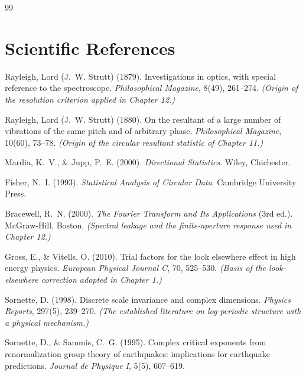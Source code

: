 \documentclass[11pt, letterpaper, openany]{book}
\begin{document}
\begin{thebibliography}{99}
\section*{Scientific References}


Rayleigh, Lord (J.~W. Strutt) (1879).
Investigations in optics, with special reference to the spectroscope.
\textit{Philosophical Magazine}, 8(49), 261--274.
\textit{(Origin of the resolution criterion applied in Chapter 12.)}

Rayleigh, Lord (J.~W. Strutt) (1880).
On the resultant of a large number of vibrations of the same pitch and of arbitrary phase.
\textit{Philosophical Magazine}, 10(60), 73--78.
\textit{(Origin of the circular resultant statistic of Chapter 11.)}

Mardia, K.~V., \& Jupp, P.~E. (2000).
\textit{Directional Statistics}. Wiley, Chichester.

Fisher, N.~I. (1993).
\textit{Statistical Analysis of Circular Data}. Cambridge University Press.

Bracewell, R.~N. (2000).
\textit{The Fourier Transform and Its Applications} (3rd ed.). McGraw-Hill, Boston.
\textit{(Spectral leakage and the finite-aperture response used in Chapter 12.)}

Gross, E., \& Vitells, O. (2010).
Trial factors for the look elsewhere effect in high energy physics.
\textit{European Physical Journal C}, 70, 525--530.
\textit{(Basis of the look-elsewhere correction adopted in Chapter 1.)}


Sornette, D. (1998).
Discrete scale invariance and complex dimensions.
\textit{Physics Reports}, 297(5), 239--270.
\textit{(The established literature on log-periodic structure with a physical mechanism.)}

Sornette, D., \& Sammis, C.~G. (1995).
Complex critical exponents from renormalization group theory of earthquakes:
implications for earthquake predictions.
\textit{Journal de Physique I}, 5(5), 607--619.


\end{thebibliography}
\end{document}
